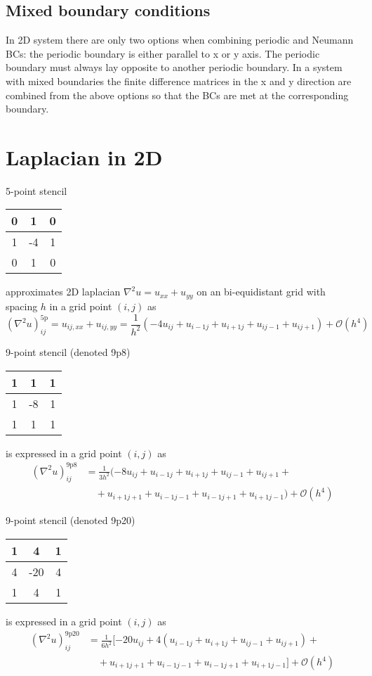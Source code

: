 \subsection*{Mixed boundary conditions}
In 2D system there are only two options when combining periodic and Neumann BCs: the periodic boundary is either parallel to x or y axis. The periodic boundary must always lay opposite to another periodic boundary. In a system with mixed boundaries the finite difference matrices in the x and y direction are combined from the above options so that the BCs are met at the corresponding boundary. 

\section*{Laplacian in 2D}
5-point stencil 
\begin{tabular}{c|c|c}
	0&1&0  \\\hline
	1&-4&1 \\\hline
	0&1&0
\end{tabular} 
approximates 2D laplacian $\nabla^2 u = u_{xx}+u_{yy}$ on an bi-equidistant grid with spacing $h$ in a grid point $(i,j)$ as
\begin{equation}
	(\nabla^2u)_{ij}^{\mathrm{5p}} = u_{ij,xx} + u_{ij,yy} = \frac{1}{h^2}(-4u_{ij} + u_{i-1j}+ u_{i+1j}+ u_{ij-1}+ u_{ij+1}) + \mathcal{O}(h^4)
\end{equation}

9-point stencil (denoted 9p8)
\begin{tabular}{c|c|c}
	1&1&1  \\\hline
	1&-8&1 \\\hline
	1&1&1
\end{tabular} 
is expressed in a grid point $(i,j)$ as
\begin{equation}
	\begin{split}
		(\nabla^2u)_{ij}^{\mathrm{9p8}} &=  \frac{1}{3h^2}(-8u_{ij} + u_{i-1j}+ u_{i+1j}+ u_{ij-1}+ u_{ij+1} +\\
		&\quad+ u_{i+1j+1}+u_{i-1j-1}+u_{i-1j+1}+u_{i+1j-1}) + \mathcal{O}(h^4)
	\end{split}
\end{equation}

9-point stencil (denoted 9p20)
\begin{tabular}{c|c|c}
	1&4&1  \\\hline
	4&-20&4 \\\hline
	1&4&1
\end{tabular} 
is expressed in a grid point $(i,j)$ as
\begin{equation}
	\begin{split}
		(\nabla^2u)_{ij}^{\mathrm{9p20}} &=  \frac{1}{6h^2}[-20u_{ij} + 4(u_{i-1j}+ u_{i+1j}+ u_{ij-1}+ u_{ij+1}) +\\
		&\quad+ u_{i+1j+1}+u_{i-1j-1}+u_{i-1j+1}+u_{i+1j-1}] + \mathcal{O}(h^4)
	\end{split}
\end{equation}

